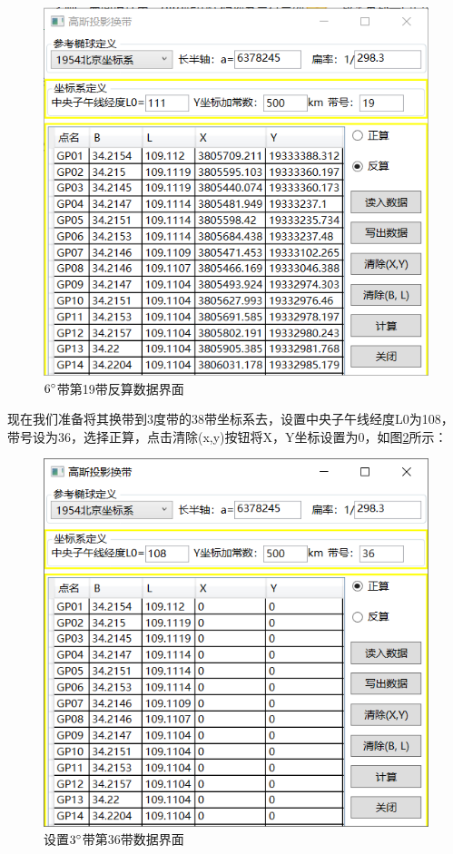 \begin{figure}[htbp]
    \centering
    \includegraphics[scale=0.8]{gaussProj/UI04.png}
    \caption{$6^\circ$带第19带反算数据界面}
    \label{fig:GaussProjUI04}
\end{figure}

现在我们准备将其换带到3度带的38带坐标系去，设置中央子午线经度L0为108，
带号设为36，选择正算，点击清除(x,y)按钮将X，Y坐标设置为0，如图\ref{fig:GaussProjUI05}所示：

\begin{figure}[htbp]
    \centering
    \includegraphics[scale=0.8]{gaussProj/UI05.png}
    \caption{设置$3^\circ$带第36带数据界面}
    \label{fig:GaussProjUI05}
\end{figure}

